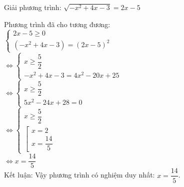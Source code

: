 \begin{baitap}
 Giải phương trình: $ \sqrt{-x^2+4x-3}=2x-5 $
\begin{loigiai1}
    Phương trình đã cho tương đương: \\
    $ \begin{cases}
        2x -5 \geq 0 \\
        (-x^2 +4x -3) = (2x-5)^2
    \end{cases} $ \\
    $ \Leftrightarrow 
        \begin{cases}
            x \geq \dfrac{5}{2} \\
            -x^2 + 4x -3 = 4x^2 -20x + 25
        \end{cases} $ \\
    $ \Leftrightarrow 
    \begin{cases}
        x \geq \dfrac{5}{2 } \\
        5x^2 -24x +28 =0
    \end{cases} $ \\
    $ \Leftrightarrow 
    \begin{cases}
        x \geq \dfrac{5 }{2 } \\
        \left[
            \begin{array}{l}
                x=2 \\
                x=\dfrac{14 }{5 }  
            \end{array}
        \right. 
    \end{cases} $ \\
    $ \Leftrightarrow  x=\dfrac{14 }{5 } $ \\
    Kết luận: Vậy phương trình có nghiệm duy nhất: $ x=\dfrac{14 }{5 }   $.
\end{loigiai1}

\end{baitap}
